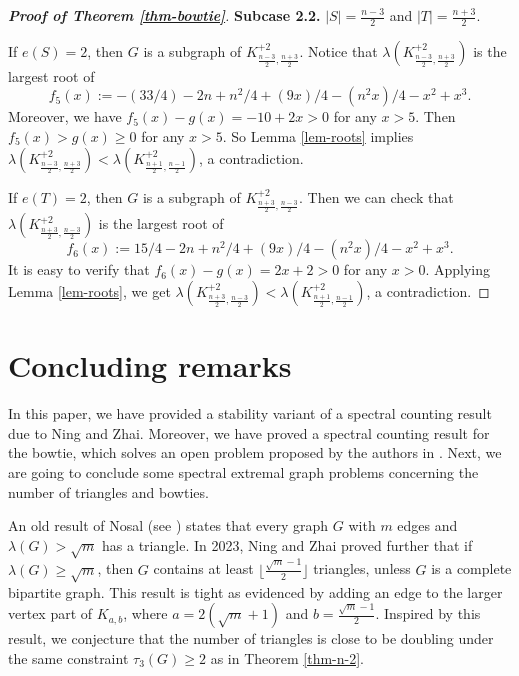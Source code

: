 \documentclass[11pt]{article}
\begin{document}
\begin{proof}[{\bf Proof of Theorem \ref{thm-bowtie}}]
\medskip 
{\bf Subcase 2.2.}  $|S|= \frac{n-3}{2} $ and $|T|=\frac{n+3}{2}$. 

If $e(S)=2$, then $G$ is a subgraph of $K_{\frac{n-3}{2} , \frac{n+3}{2} }^{+2}$. 
Notice that $\lambda(K_{\frac{n-3}{2} , \frac{n+3}{2} }^{+2})$ 
is the largest root of 
\[ f_5(x) := -(33/4) - 2 n + n^2/4 + (9 x)/4 - (n^2 x)/4 - x^2 + x^3.  \]
Moreover, we have $f_5(x) - g(x)= -10 + 2 x >0$ 
for any $x>5$. Then 
$f_5(x) > g(x) \ge 0$ for any 
$x>5$. 
 So Lemma \ref{lem-roots}
 implies $\lambda (K_{\frac{n-3}{2} , \frac{n+3}{2} }^{+2}) 
< \lambda (K_{\frac{n+1}{2} , \frac{n-1}{2} }^{+2})$, 
a contradiction. 

If $e(T)=2$, then $G$ is a subgraph of $K_{\frac{n+3}{2} , \frac{n-3}{2} }^{+2}$. Then we can check that 
$\lambda (K_{\frac{n+3}{2} , \frac{n-3}{2} }^{+2})$ 
is the largest root of 
\[ f_6(x):= 15/4 - 2 n + n^2/4 + (9 x)/4 - (n^2 x)/4 - x^2 + x^3.  \]
It is easy to verify that $f_6(x) - g(x)= 2x+2 >0$ 
for any $x>0$.  
Applying Lemma \ref{lem-roots},
 we get  $ \lambda (K_{\frac{n+3}{2} , \frac{n-3}{2} }^{+2}) <   \lambda (K_{\frac{n+1}{2} , \frac{n-1}{2} }^{+2})$, a contradiction. 
\end{proof}






\section{Concluding remarks}
\label{sec7}

In this paper, we have provided a stability variant of 
a spectral counting result due to Ning and Zhai. 
Moreover, we have proved a spectral counting 
result for the bowtie, which solves an open problem 
proposed by the authors in \cite{2022LLP}.  
 Next,  we are going to conclude some spectral extremal graph problems concerning the number of 
 triangles and bowties. 
 
 \medskip 
 
An old result of Nosal \cite{Nosal1970} 
(see \cite{Niki2002cpc,Ning2017-ars}) 
states that every graph $G$ with
$m$ edges and $\lambda (G) > \sqrt{m}$ 
has a triangle.
In 2023, Ning and Zhai \cite{NZ2021}
proved further that if
$  \lambda (G)\ge \sqrt{m}$,
then $G$ contains at least $\lfloor \frac{\sqrt{m}-1}{2} \rfloor$  triangles, unless $G$ is a complete bipartite graph. 
This result is tight as evidenced by adding an edge to the larger vertex part of $K_{a,b}$, where $a=2(\sqrt{m} +1)$ and $b=\frac{\sqrt{m}-1}{2}$. 
Inspired by this result, 
we conjecture that the number of triangles is close 
to be doubling under the same constraint $\tau_3(G)\ge 2$ as in Theorem \ref{thm-n-2}. 
\end{document}
